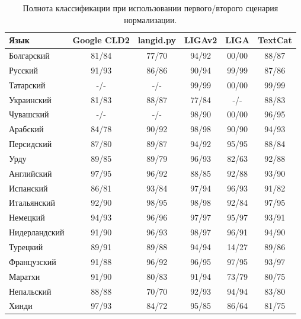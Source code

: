 \documentclass[a4paper, 14pt]{article}
\begin{document}
\begin{center}
\begin{table}
\begin{tabular*}{0.933\textwidth}{| l| *{5}{c} |}
\hline 
Язык & Google CLD2 & langid.py & LIGAv2 & LIGA & TextCat \\
\hline
\hline
Болгарский & 81/84 & 77/70 & 94/92 & 00/00 & 88/87 \\
Русский & 91/93 & 86/86 & 90/94 & 99/99 & 87/86 \\
Татарский & -/- & -/- & 99/99 & 00/00 & 99/99 \\
Украинский & 81/83 & 88/87 & 77/84 & -/- & 88/83 \\
Чувашский & -/- & -/- & 98/90 & 00/00 & 96/95 \\

\hline
\hline
Арабский & 84/78 & 90/92 & 98/98 & 90/90 & 94/93 \\
Персидский & 87/80 & 89/87 & 94/92 & 95/95 & 88/84 \\
Урду & 89/85 & 89/79 & 96/93 & 82/63 & 92/88 \\

\hline
\hline
Английский & 97/95 & 96/92 & 88/85 & 92/88 & 93/90 \\
Испанский & 86/81 & 93/84 & 97/94 & 96/93 & 91/82 \\
Итальянский & 92/90 & 98/95 & 98/98 & 92/84 & 97/95 \\
Немецкий & 94/93 & 96/96 & 97/97 & 95/97 & 93/91 \\
Нидерландский & 91/90 & 96/93 & 98/97 & 96/91 & 94/90 \\
Турецкий & 89/91 & 89/88 & 94/94 & 14/27 & 89/86 \\
Французский & 91/88 & 96/92 & 96/95 & 97/95 & 93/97 \\
\hline
\hline
Маратхи & 91/90 & 80/83 & 91/94 & 73/79 & 80/75 \\
Непальский & 88/88 & 70/70 & 92/93 & 94/94 & 83/80 \\
Хинди & 97/93 & 84/72 & 95/85 & 86/64 & 81/75 \\

\hline
\end{tabular*}
\caption{Полнота классификации при использовании первого/второго сценария нормализации.}
\end{table}
\end{center}
\end{document}
